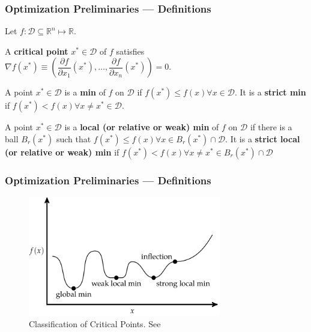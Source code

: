 \documentclass[11pt,xcolor={svgnames},aspectratio=169,usepdftitle=false]{beamer}
\begin{document}
\begin{frame}
  \frametitle{Optimization Preliminaries --- Definitions}
Let $f : \mathcal{D}\subseteq\mathbb{R}^n \mapsto \mathbb{R}$. 

\begin{definition}
A \alert{\textbf{critical point}} $x^*\in\mathcal{D}$ of $f$ satisfies $\nabla f(x^*) \equiv \left(\dfrac{\partial f}{\partial x_1}(x^*), \ldots,\dfrac{\partial f}{\partial x_n}(x^*)\right) = 0$.
\end{definition}

\begin{definition}
A point $x^*\in\mathcal{D}$ is a \alert{\textbf{min}} of $f$ on $\mathcal{D}$ if $f(x^*)\leq f(x) \forall x\in\mathcal{D}$. It is a \alert{\textbf{strict min}} if $f(x^*) < f(x) \forall x\neq x^*\in\mathcal{D}$.
\end{definition}

\begin{definition}
A point $x^*\in\mathcal{D}$ is a \alert{\textbf{local (or relative or weak) min}} of $f$ on $\mathcal{D}$ if there is a ball $B_r(x^*)$ such that $f(x^*) \leq f(x) \forall x\in B_r(x^*)\cap\mathcal{D}$. It is a \alert{\textbf{strict local (or relative or weak) min}} if $f(x^*) < f(x) \forall x\neq x^*\in B_r(x^*)\cap\mathcal{D}$
\end{definition}
\end{frame}

\begin{frame}
  \frametitle{Optimization Preliminaries --- Definitions}
\begin{figure}
  \centering
    \includegraphics[width = 0.75\textwidth]{../figures/classification_critical_points.png}
    \caption{Classification of Critical Points. See \cite{kochenderfer2019optimization}}
\end{figure}
\end{frame}
\end{document}
